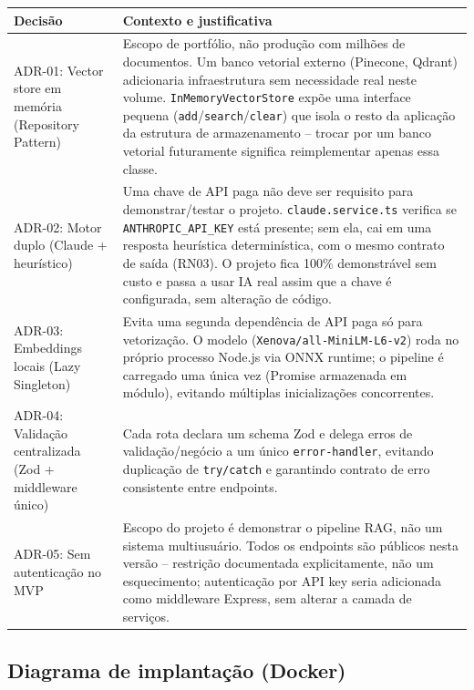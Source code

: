 \documentclass[11pt,a4paper]{article}
\begin{document}
\begin{longtable}{p{3.2cm}p{10.3cm}}
\toprule
\textbf{Decisão} & \textbf{Contexto e justificativa} \\
\midrule
\endhead
ADR-01: Vector store em memória (Repository Pattern) &
Escopo de portfólio, não produção com milhões de documentos. Um banco vetorial
externo (Pinecone, Qdrant) adicionaria infraestrutura sem necessidade real neste
volume. \texttt{InMemoryVectorStore} expõe uma interface pequena
(\texttt{add}/\texttt{search}/\texttt{clear}) que isola o resto da aplicação da
estrutura de armazenamento -- trocar por um banco vetorial futuramente significa
reimplementar apenas essa classe. \\
\addlinespace
ADR-02: Motor duplo (Claude + heurístico) &
Uma chave de API paga não deve ser requisito para demonstrar/testar o projeto.
\texttt{claude.service.ts} verifica se \texttt{ANTHROPIC\_API\_KEY} está presente;
sem ela, cai em uma resposta heurística determinística, com o mesmo contrato de
saída (RN03). O projeto fica 100\% demonstrável sem custo e passa a usar IA real
assim que a chave é configurada, sem alteração de código. \\
\addlinespace
ADR-03: Embeddings locais (Lazy Singleton) &
Evita uma segunda dependência de API paga só para vetorização. O modelo
(\texttt{Xenova/all-MiniLM-L6-v2}) roda no próprio processo Node.js via ONNX
runtime; o pipeline é carregado uma única vez (Promise armazenada em módulo),
evitando múltiplas inicializações concorrentes. \\
\addlinespace
ADR-04: Validação centralizada (Zod + middleware único) &
Cada rota declara um schema Zod e delega erros de validação/negócio a um único
\texttt{error-handler}, evitando duplicação de \texttt{try/catch} e garantindo
contrato de erro consistente entre endpoints. \\
\addlinespace
ADR-05: Sem autenticação no MVP &
Escopo do projeto é demonstrar o pipeline RAG, não um sistema multiusuário. Todos
os endpoints são públicos nesta versão -- restrição documentada explicitamente,
não um esquecimento; autenticação por API key seria adicionada como middleware
Express, sem alterar a camada de serviços. \\
\bottomrule
\end{longtable}

\subsection{Diagrama de implantação (Docker)}
\end{document}
